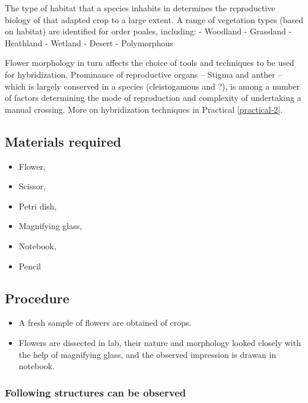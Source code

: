 \documentclass[]{article}
\providecommand{\tightlist}{%
  \setlength{\itemsep}{0pt}\setlength{\parskip}{0pt}}
\begin{document}
The type of habitat that a species inhabits in determines the reproductive biology of that adapted crop to a large extent. A range of vegetation types (based on habitat) are identified for order poales, including:
- Woodland
- Grassland
- Heathland
- Wetland
- Desert
- Polymorphous

Flower morphology in turn affects the choice of tools and techniques to be used for hybridization. Prominance of reproductive organs -- Stigma and anther -- which is largely conserved in a species (cleistogamous and ?), is among a number of factors determining the mode of reproduction and complexity of undertaking a manual crossing. More on hybridization techniques in Practical \ref{practical-2}.

\hypertarget{materials-required}{%
\subsection{Materials required}\label{materials-required}}

\begin{itemize}
\tightlist
\item
  Flower,
\item
  Scissor,
\item
  Petri dish,
\item
  Magnifying glass,
\item
  Notebook,
\item
  Pencil
\end{itemize}

\hypertarget{procedure}{%
\subsection{Procedure}\label{procedure}}

\begin{itemize}
\tightlist
\item
  A fresh sample of flowers are obtained of crops.
\item
  Flowers are dissected in lab, their nature and morphology looked closely with the help of magnifying glass, and the observed impression is drawan in notebook.
\end{itemize}

\hypertarget{following-structures-can-be-observed}{%
\subsubsection{Following structures can be observed}\label{following-structures-can-be-observed}}
\end{document}
